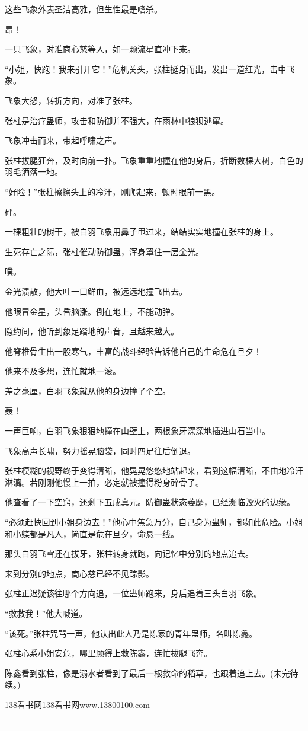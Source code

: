\begin{this_body}
这些飞象外表圣洁高雅，但生性最是嗜杀。

昂！

一只飞象，对准商心慈等人，如一颗流星直冲下来。

“小姐，快跑！我来引开它！”危机关头，张柱挺身而出，发出一道红光，击中飞象。

飞象大怒，转折方向，对准了张柱。

张柱是治疗蛊师，攻击和防御并不强大，在雨林中狼狈逃窜。

飞象冲击而来，带起呼啸之声。

张柱拔腿狂奔，及时向前一扑。飞象重重地撞在他的身后，折断数棵大树，白色的羽毛洒落一地。

“好险！”张柱擦擦头上的冷汗，刚爬起来，顿时眼前一黑。

砰。

一棵粗壮的树干，被白羽飞象用鼻子甩过来，结结实实地撞在张柱的身上。

生死存亡之际，张柱催动防御蛊，浑身罩住一层金光。

噗。

金光溃散，他大吐一口鲜血，被远远地撞飞出去。

他眼冒金星，头昏脑涨。倒在地上，不能动弹。

隐约间，他听到象足踏地的声音，且越来越大。

他脊椎骨生出一股寒气，丰富的战斗经验告诉他自己的生命危在旦夕！

他来不及多想，连忙就地一滚。

差之毫厘，白羽飞象就从他的身边撞了个空。

轰！

一声巨响，白羽飞象狠狠地撞在山壁上，两根象牙深深地插进山石当中。

飞象高声长啸，努力摇晃脑袋，同时四足往后倒退。

张柱模糊的视野终于变得清晰，他晃晃悠悠地站起来，看到这幅清晰，不由地冷汗淋漓。若刚刚他慢上一拍，必定就被撞得粉身碎骨了。

他查看了一下空窍，还剩下五成真元。防御蛊状态萎靡，已经濒临毁灭的边缘。

“必须赶快回到小姐身边去！”他心中焦急万分，自己身为蛊师，都如此危险。小姐和小蝶都是凡人，简直是危在旦夕，命悬一线。

那头白羽飞雪还在拔牙，张柱转身就跑，向记忆中分别的地点追去。

来到分别的地点，商心慈已经不见踪影。

张柱正迟疑该往哪个方向追，一位蛊师跑来，身后追着三头白羽飞象。

“救救我！”他大喊道。

“该死。”张柱咒骂一声，他认出此人乃是陈家的青年蛊师，名叫陈鑫。

张柱心系小姐安危，哪里顾得上救陈鑫，连忙拔腿飞奔。

陈鑫看到张柱，像是溺水者看到了最后一根救命的稻草，也跟着追上去。(未完待续。)

138看书网138看书网www.13800100.com

------------

\end{this_body}


